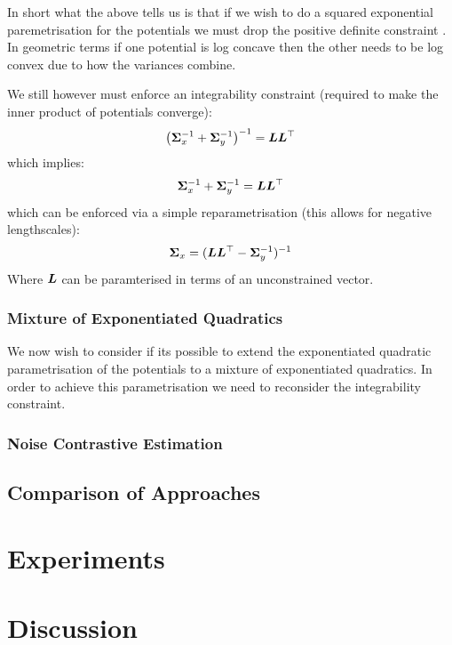 \documentclass[a4paper,12pt,twoside,openright]{report}
\theoremstyle{definition}
\begin{document}
In short what the above tells us is that if we wish to do a squared exponential paremetrisation for the potentials we must drop the positive definite constraint . In geometric terms if one potential is log concave then the other needs to be log convex due to how the variances combine.

We still however must enforce an integrability constraint (required to make the inner product of potentials converge):
\begin{align*}
\left({\bm{\Sigma}}_x^{-1} +{\bm{\Sigma}}_y^{-1}\right)^{-1} = {\bm{L}}{\bm{L}}^{\top}
\end{align*}
which implies:
\begin{align*}
{\bm{\Sigma}}_x^{-1} +{\bm{\Sigma}}_y^{-1} = {\bm{L}}{\bm{L}}^{\top}
\end{align*}
which can be enforced via a simple reparametrisation (this allows for negative lengthscales):
\begin{align*}
{\bm{\Sigma}}_x = ({\bm{L}}{\bm{L}}^{\top} -{\bm{\Sigma}}_y^{-1})^{-1}
\end{align*}
Where ${\bm{L}}$ can be paramterised in terms of an unconstrained vector.
\subsection{Mixture of Exponentiated Quadratics}


We now wish to consider if its possible to extend the exponentiated quadratic  parametrisation of the potentials to a mixture of exponentiated quadratics. In order to achieve this parametrisation we need to reconsider the integrability constraint.
\subsection{Noise Contrastive Estimation}
\section{Comparison of Approaches}

\chapter{Experiments}

\chapter{Discussion}


\appendix
\singlespacing

 
 
\end{document}
